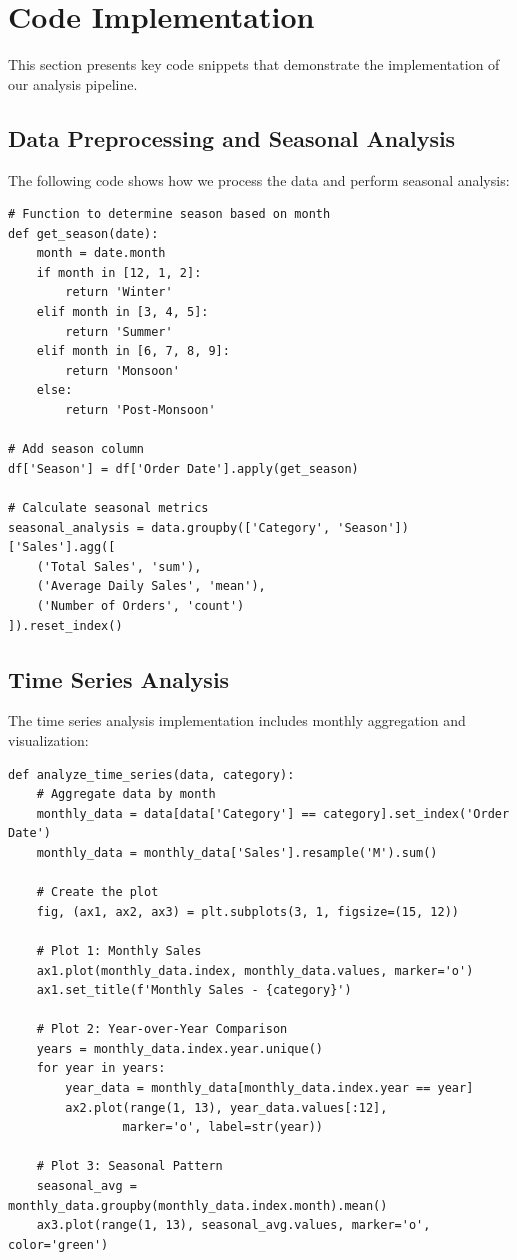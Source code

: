 \documentclass[11pt,a4paper]{article}
\begin{document}
\section{Code Implementation}
This section presents key code snippets that demonstrate the implementation of our analysis pipeline.

\subsection{Data Preprocessing and Seasonal Analysis}
The following code shows how we process the data and perform seasonal analysis:

\begin{lstlisting}[caption=Data Preprocessing and Seasonal Analysis]
# Function to determine season based on month
def get_season(date):
    month = date.month
    if month in [12, 1, 2]:
        return 'Winter'
    elif month in [3, 4, 5]:
        return 'Summer'
    elif month in [6, 7, 8, 9]:
        return 'Monsoon'
    else:
        return 'Post-Monsoon'

# Add season column
df['Season'] = df['Order Date'].apply(get_season)

# Calculate seasonal metrics
seasonal_analysis = data.groupby(['Category', 'Season'])['Sales'].agg([
    ('Total Sales', 'sum'),
    ('Average Daily Sales', 'mean'),
    ('Number of Orders', 'count')
]).reset_index()
\end{lstlisting}

\subsection{Time Series Analysis}
The time series analysis implementation includes monthly aggregation and visualization:

\begin{lstlisting}[caption=Time Series Analysis Implementation]
def analyze_time_series(data, category):
    # Aggregate data by month
    monthly_data = data[data['Category'] == category].set_index('Order Date')
    monthly_data = monthly_data['Sales'].resample('M').sum()
    
    # Create the plot
    fig, (ax1, ax2, ax3) = plt.subplots(3, 1, figsize=(15, 12))
    
    # Plot 1: Monthly Sales
    ax1.plot(monthly_data.index, monthly_data.values, marker='o')
    ax1.set_title(f'Monthly Sales - {category}')
    
    # Plot 2: Year-over-Year Comparison
    years = monthly_data.index.year.unique()
    for year in years:
        year_data = monthly_data[monthly_data.index.year == year]
        ax2.plot(range(1, 13), year_data.values[:12], 
                marker='o', label=str(year))
    
    # Plot 3: Seasonal Pattern
    seasonal_avg = monthly_data.groupby(monthly_data.index.month).mean()
    ax3.plot(range(1, 13), seasonal_avg.values, marker='o', color='green')
\end{lstlisting}
\end{document}
